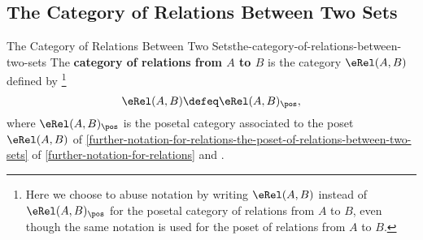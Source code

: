 \subsection{The Category of Relations Between Two Sets}\label{subsection-the-category-of-relations-between-two-sets}
\begin{definition}{The Category of Relations Between Two Sets}{the-category-of-relations-between-two-sets}%
    The \textbf{category of relations from $A$ to $B$} is the category $\eRel(A,B)$ defined by%
    \footnote{%
        Here we choose to abuse notation by writing $\eRel(A,B)$ instead of $\eRel(A,B)_{\pos}$ for the posetal category of relations from $A$ to $B$, even though the same notation is used for the poset of relations from $A$ to $B$.
        \par\vspace*{\TCBBoxCorrection}
    } %
    \[
        \eRel(A,B)%
        \defeq
        \eRel(A,B)_{\pos},%
    \]%
    where $\eRel(A,B)_{\pos}$ is the posetal category associated to the poset $\eRel(A,B)$ of \cref{further-notation-for-relations-the-poset-of-relations-between-two-sets} of \cref{further-notation-for-relations} and .%
\end{definition}
